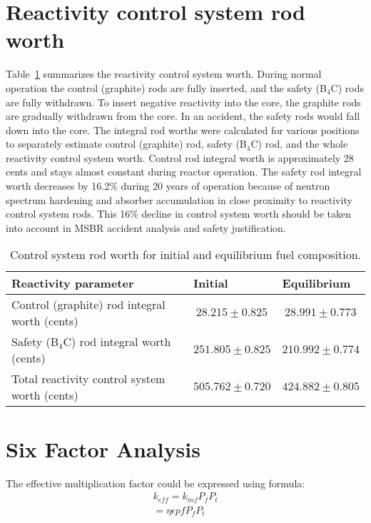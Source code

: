 \section{Reactivity control system rod worth}
Table~\ref{tab:rod_worth} summarizes the reactivity control system worth. During normal operation the control (graphite) rods are fully inserted, and the safety (B$_4$C) rods are fully withdrawn. To insert negative reactivity into the core, the graphite rods are gradually withdrawn from the core. In an accident, the safety rods would fall down into the core. The integral rod worths were calculated for various positions to separately estimate control (graphite) rod, safety (B$_4$C) rod, and the whole reactivity control system worth. Control rod integral worth is approximately 28 cents and stays almost constant during reactor operation. The safety rod integral worth decreases by  16.2\% during 20 years of operation because of neutron spectrum hardening and absorber accumulation in close proximity to reactivity control system rods. This 16\% decline in control system worth should be taken into account in \gls{MSBR} accident analysis and safety justification.

\begin{table}[hb!]
  \centering
  \caption{Control system rod worth for initial and equilibrium fuel composition.}
\begin{tabular}{| m{} | m{} | m{} |} \hline
\qquad\qquad Reactivity parameter  & \quad Initial      & \enspace Equilibrium      \\[3pt] \hline   
Control (graphite) rod integral worth (cents)               & $\ 28.215\pm0.825$   & $\ 28.991\pm0.773$ \\[3pt]  \hline 
Safety (B$_4$C) rod integral worth (cents)                  & $251.805\pm0.825$    & $210.992\pm0.774$  \\[3pt]  \hline
Total reactivity control system worth (cents)      & $505.762\pm0.720$    & $424.882\pm0.805$ \\[3pt] \hline
\end{tabular}
  \label{tab:rod_worth}
\end{table}

\section{Six Factor Analysis}
The effective multiplication factor could be expressed using formula:
\begin{align*}
k_{eff} = k_{inf} P_f  P_t \\
 = \eta \epsilon p f P_f P_t
\end{align*}

